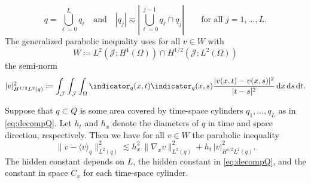 \documentclass{amsart}
\providecommand{\dx}{\,\mathrm{d}x}
\providecommand{\dt}{\,\mathrm{d}t}
\providecommand{\ds}{\,\mathrm{d}s}
\newcommand{\cJ}{\mathcal J}
\begin{document}
\begin{equation}\label{eq:decompQ}
q = \bigcup_{\ell=0}^L q_\ell\quad\text{and}\quad
|q_j| \eqsim \left|\bigcup_{\ell=0}^{j-1} q_\ell \cap q_{j}\right|\qquad \text{for all }j=1,\dots,L.
\end{equation} 
The generalized parabolic \Poincare{} inequality uses for all $v\in W$ with 
\begin{equation*}
W \coloneqq L^2(\cJ;H^1(\Omega)) \cap H^{1/2}(\cJ;L^2(\Omega))
\end{equation*}
 the semi-norm  
\begin{equation*}
\lvert v \rvert^2_{H^{1/2}L^2(q)} \coloneqq \int_\mathcal{J} \int_\mathcal{J} \int_\Omega \indicator_q(x,t) \indicator_q(x,s) \frac{|v(x,t) - v(x,s)|^2}{|t-s|^2} \dx \ds \dt.
\end{equation*}
\begin{lemma}\label{lem:GenParaPoincareH12}
Suppose that $q \subset Q$ is some area covered by time-space cylinders $q_1,\dots,q_L$ as in \eqref{eq:decompQ}. Let $h_t$ and $h_x$ denote the diameters of $q$ in time and space direction, respectively.
Then we have for all $v\in W$ the parabolic \Poincare{} inequality
\begin{equation*}
\lVert v - \langle v \rangle_q \rVert^2_{L^2(q)} \lesssim  h_x^2 \, \lVert \nabla_x v \rVert_{L^2(q)}^2 + h_t\, \lvert v \rvert^2_{H^{1/2}L^2(q)}.
\end{equation*}
The hidden constant depends on $L$, the hidden constant in \eqref{eq:decompQ}, and the \Poincare{} constant in space $C_x$ for each time-space cylinder.
\end{lemma}
\end{document}
